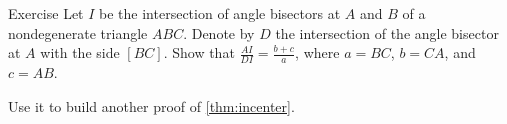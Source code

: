 \begin{thm}{Exercise}\label{ex:bisector-incenter}
Let $I$ be the intersection of angle bisectors at $A$ and $B$ of a nondegenerate triangle $ABC$.
Denote by $D$ the intersection of the angle bisector at $A$ with the side $[BC]$.
Show that $\frac{AI}{DI}=\frac{b+c}{a}$,
where $a=BC$, $b=CA$, and $c=AB$.

Use it to build another proof of \ref{thm:incenter}.
\end{thm}




